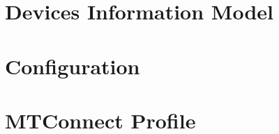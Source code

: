 \section{Devices Information Model}






\section{Configuration}






\section{MTConnect Profile}

